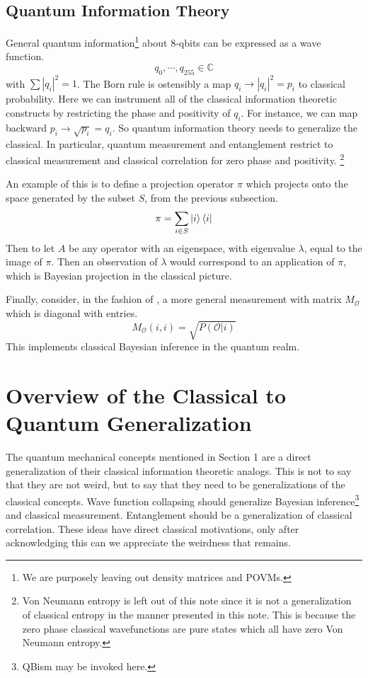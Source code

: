 \documentclass[12pt,a4paper]{article}
\begin{document}
\subsection{Quantum Information Theory}
General quantum information\footnote{We are purposely leaving out density matrices and POVMs.} about 8-qbits can be expressed as a wave function.
\[
   q_0,\cdots,q_{255} \in \mathbb{C}
\]
with $\sum |q_i|^2 = 1$.  The Born rule is ostensibly a map $q_i \rightarrow |q_i|^2 = p_i$ to classical probability.  Here we can instrument all of the classical information theoretic constructs by restricting the phase and positivity of $q_i$.  For instance, we can map backward $p_i \rightarrow \sqrt{p_i} = q_i$.  So quantum information theory needs to generalize the classical.  In particular, quantum measurement and entanglement restrict to classical measurement and classical correlation for zero phase and positivity. \footnote{Von Neumann entropy is left out of this note since it is not a generalization of classical entropy in the manner presented in this note.  This is because the zero phase classical wavefunctions are pure states which all have zero Von Neumann entropy.}

An example of this is to define a projection operator $\pi$ which projects onto the space generated by the subset $S$, from the previous subsection.
\[
\pi = \sum_{i \in S} \ket{i} \bra{i}
\]
Then to let $A$ be any operator with an eigenspace, with eigenvalue $\lambda$, equal to the image of $\pi$.  Then an observation of $\lambda$ would correspond to an application of $\pi$, which is Bayesian projection in the classical picture.

Finally, consider, in the fashion of \cite{nielsenchuang}, a more general measurement with matrix $M_\mathcal{O}$ which is diagonal with entries.
\[
   M_\mathcal{O}(i,i) = \sqrt{P(\mathcal{O} | i)}
\]
This implements classical Bayesian inference in the quantum realm.

\section{Overview of the Classical to Quantum Generalization}

The quantum mechanical concepts mentioned in Section 1 are a direct generalization of their classical information theoretic analogs.  This is not to say that they are not weird, but to say that they need to be generalizations of the classical concepts.  Wave function collapsing should generalize Bayesian inference\footnote{QBism may be invoked here.} and classical measurement.  Entanglement should be a generalization of classical correlation.  These ideas have direct classical motivations, only after acknowledging this can we appreciate the weirdness that remains.
\end{document}
